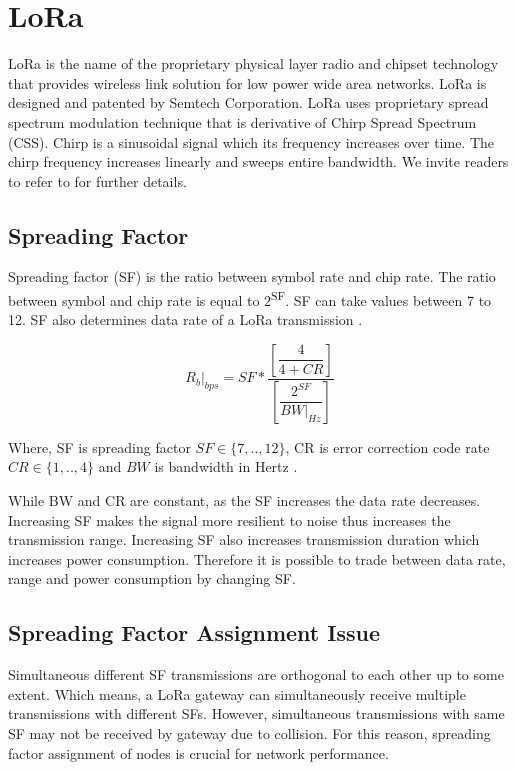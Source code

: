 \documentclass[conference]{IEEEtran}
\begin{document}
\section{LoRa}
\par LoRa is the name of the proprietary physical layer radio and chipset technology that provides wireless link solution for low power wide area networks. LoRa is designed and patented by Semtech Corporation. LoRa uses proprietary spread spectrum modulation technique that is derivative of Chirp Spread Spectrum (CSS). Chirp is a sinusoidal signal which its  frequency increases over time. The chirp frequency increases linearly and sweeps entire bandwidth. We invite readers to refer to \cite{AN1200.22} for further details.

\subsection{Spreading Factor}
\par Spreading factor (SF) is the ratio between symbol rate and chip rate. The ratio between symbol and chip rate is equal to $2$\textsuperscript{SF}. SF can take values between 7 to 12. SF also determines data rate of a LoRa transmission \cite{AN1200.22}.

\begin{equation} \label{eq:bit_rate_sf}
R_{b}|_{bps} = SF * \dfrac{\left[ \dfrac{4}{4+CR} \right] }{ \left[ \dfrac{2^{SF}}{BW|_{Hz}} \right]}
\end{equation}

Where, SF is spreading factor $SF \in \{7,..,12\}$, CR is error correction code rate $CR \in \{1,..,4\}$ and $BW$ is bandwidth in Hertz \cite{AN1200.22}.

\par While BW and CR are constant, as the SF increases the data rate decreases. Increasing SF makes the signal more resilient to noise thus increases the transmission range. Increasing SF also increases transmission duration which increases power consumption. Therefore it is possible to trade between data rate, range and power consumption by  changing SF.

\subsection{Spreading Factor Assignment Issue}
\par Simultaneous different SF transmissions are orthogonal to each other up to some extent. Which means, a LoRa gateway can simultaneously receive multiple transmissions with different SFs. However, simultaneous transmissions with same SF may not be received by gateway due to collision. For this reason, spreading factor assignment of nodes is crucial for network performance.
\end{document}
